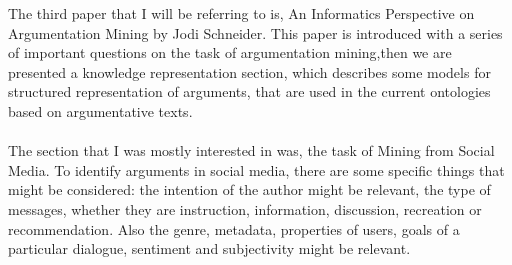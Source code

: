 \documentclass[a4paper,12pt]{report}
\begin{document}
\begin{itemize}
            The third paper that I will be referring to is, An Informatics Perspective on Argumentation Mining by Jodi Schneider. This paper is introduced with a 
series of important questions on the task of argumentation mining,then we are presented a knowledge representation section, which describes some models for structured representation of arguments, that are used in the 
current ontologies based on argumentative texts.
\\
\\
           The section that I was mostly interested in was, the task of Mining from Social Media. To identify arguments in social media, there are some specific things that might be considered: the intention of the author might 
be relevant, the type of messages,  whether they are instruction, information, discussion, recreation or recommendation. Also the genre, metadata, properties of users, goals of a particular dialogue, sentiment and subjectivity might be relevant. 

\end{itemize}
\end{document}
